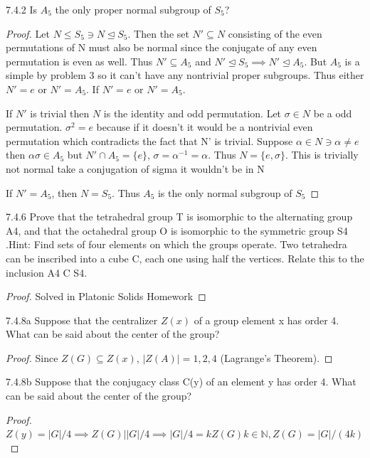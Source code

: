 \documentclass{article}
\newcommand{\N}{\mathbb{N}}
\begin{document}
\bigskip

\begin{PROB}{7.4.2}\label{Problem 7.4.2.}
    Is $A_5$ the only proper normal subgroup of $S_5$?
\end{PROB}
\begin{proof}
    Let $N \leq S_5 \ni N \trianglelefteq S_5$. Then the set $N' \subseteq N$ consisting of the even permutations of N must also be normal since the conjugate of any even permutation is even as well. Thus $N' \subseteq A_5$ and $N' \trianglelefteq S_5 \implies N' \trianglelefteq A_5$. But $A_5$ is a simple by problem 3 so it can't have any nontrivial proper subgroups. Thus either $N' = e$ or $N' = A_5$. If $N' = e$ or $N' = A_5$. 
    
    If $N'$ is trivial then $N$ is the identity and odd permutation. Let $\sigma \in N$ be a odd permutation. $\sigma^2 = e$ because if it doesn't it would be a nontrivial even permutation which contradicts the fact that N' is trivial. Suppose $\alpha \in N \ni \alpha \neq e$ then $\alpha \sigma \in A_5$ but $N' \cap A_5 = \{e\}$, $\sigma = \alpha^{-1} = \alpha$. Thus $N = \{e, \sigma\}$. This is trivially not normal take a conjugation of sigma it wouldn't be in N

    If $N' = A_5$, then $N = S_5$. Thus $A_5$ is the only normal subgroup of $S_5$
\end{proof}

\bigskip

\begin{PROB}{7.4.6}\label{Problem 7.4.6.}
    Prove that the tetrahedral group T is isomorphic to the alternating group A4, and that the octahedral group O is isomorphic to the symmetric group S4 .Hint: Find sets of four elements on which the groups operate. Two tetrahedra can be inscribed into a cube C, each one using half the vertices. Relate this to the inclusion A4 C S4.
\end{PROB}
\begin{proof}
    Solved in Platonic Solids Homework
\end{proof}

\bigskip

\begin{PROB}{7.4.8a}\label{Problem 7.4.8a.}
    Suppose that the centralizer $Z(x)$ of a group element x has order 4. What can be said about the center of the group?
\end{PROB}
\begin{proof}
    Since $Z(G) \subseteq Z(x)$, $|Z(A)| = 1, 2, 4$ (Lagrange's Theorem).
\end{proof}

\bigskip

\begin{PROB}{7.4.8b}\label{Problem 7.4.8b.}
    Suppose that the conjugacy class C(y) of an element y has order 4. What can be said about the center of the group?
\end{PROB}
\begin{proof}
    $Z(y) = |G|/4 \implies Z(G) | |G|/4 \implies |G|/4 = kZ(G) k \in \N, Z(G) = |G|/(4k)$
\end{proof}
\end{document}
